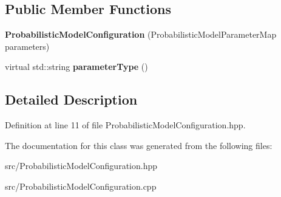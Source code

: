 \subsection*{Public Member Functions}
\begin{DoxyCompactItemize}
\item 
\mbox{\label{classtops_1_1ProbabilisticModelConfiguration_ae54b7d4a07e49893ce9eacf7ff913942}} 
{\bfseries Probabilistic\+Model\+Configuration} (Probabilistic\+Model\+Parameter\+Map parameters)
\item 
\mbox{\label{classtops_1_1ProbabilisticModelConfiguration_a0df6bc6b4687b70183d3dc905dfd6cba}} 
virtual std\+::string {\bfseries parameter\+Type} ()
\end{DoxyCompactItemize}


\subsection{Detailed Description}


Definition at line 11 of file Probabilistic\+Model\+Configuration.\+hpp.



The documentation for this class was generated from the following files\+:\begin{DoxyCompactItemize}
\item 
src/Probabilistic\+Model\+Configuration.\+hpp\item 
src/Probabilistic\+Model\+Configuration.\+cpp\end{DoxyCompactItemize}
